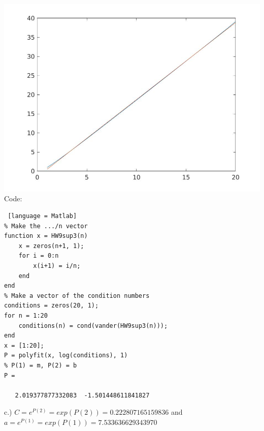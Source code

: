 \documentclass[12pt]{article}
\theoremstyle{homework}
\begin{document}
\includegraphics[scale=0.5]{Sup3_2.jpg}
Code:
\begin{lstlisting} [language = Matlab]
% Make the .../n vector
function x = HW9sup3(n)
    x = zeros(n+1, 1);
    for i = 0:n
        x(i+1) = i/n;
    end
end
% Make a vector of the condition numbers
conditions = zeros(20, 1);
for n = 1:20
    conditions(n) = cond(vander(HW9sup3(n)));
end
x = [1:20];
P = polyfit(x, log(conditions), 1)
% P(1) = m, P(2) = b
P =

   2.019377877332083  -1.501448611841827

\end{lstlisting}
c.)\newline
$C = e^{P(2)} = exp(P(2)) = 0.222807165159836$ and $a = e^{P(1)} = exp(P(1)) = 7.533636629343970$
\end{document}
